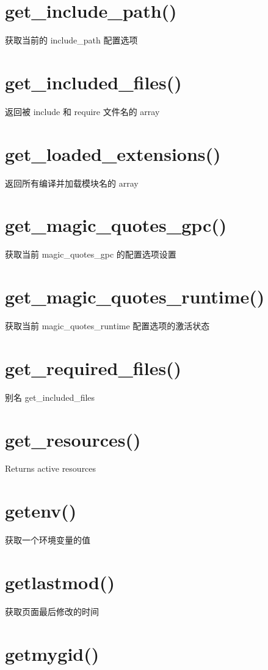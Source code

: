 \section{get\_include\_path()}

获取当前的 include\_path 配置选项
\section{get\_included\_files()}

返回被 include 和 require 文件名的 array
\section{get\_loaded\_extensions()}

返回所有编译并加载模块名的 array
\section{get\_magic\_quotes\_gpc()}

获取当前 magic\_quotes\_gpc 的配置选项设置
\section{get\_magic\_quotes\_runtime()}

获取当前 magic\_quotes\_runtime 配置选项的激活状态
\section{get\_required\_files()}

别名 get\_included\_files
\section{get\_resources()}

Returns active resources
\section{getenv()}

获取一个环境变量的值
\section{getlastmod()}

获取页面最后修改的时间
\section{getmygid()}

